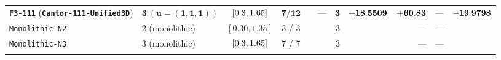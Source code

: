\begin{table}[!htbp]
{\begin{tabular}{llccccrrrrr}
\textbf{\texttt{F3-111}} (\textbf{\texttt{Cantor-111-Unified3D}}) & $\mathbf{3\ (u=(1,1,1))}$ & $[0.3{}, 1.65{}]$ & $\mathbf{7 / 12}$ & \textbf{\roundfour{\NthreeUnithreedFoneoneoneUnifiedAreaUmtwo}} & --- & $\mathbf{3}$ & $\mathbf{+\roundfour{\NthreeUnithreedFoneoneoneUnifiedFzPn}}$ & $\mathbf{+\roundtwo{\NthreeUnithreedFoneoneoneUnifiedFa}}$ & --- & $\mathbf{\roundfour{\NthreeUnithreedFoneoneoneUnifiedThetafoureightFzPn}}$ \\
\texttt{Monolithic-N2} & 2 (monolithic) & $[0.30, 1.35]$ & 3 / 3 & \NatureCantorNtwoHybridrzFullToothPlanformAreaUmtwo{} & \NatureCantorNtwoHybridrzFullToothPlanformPerimeterUm{} & 3 & \CantorNtwoHybridrzBemMonolithicThetathreeFZPn{} & --- & --- & \CantorNtwoHybridrzBemMonolithicThetafoureightFZPn{} \\
\texttt{Monolithic-N3} & 3 (monolithic) & $[0.3{}, 1.65{}]$ & 7 / 7 & \NatureFractalNthreeCantorseventrackFullToothPlanformAreaUmtwo{} & \NatureFractalNthreeCantorseventrackFullToothPlanformPerimeterUm{} & 3 & \FractalNthreeCantorseventrackBemMonolithicThetathreeFZPn{} & --- & --- & \FractalNthreeCantorseventrackBemMonolithicThetafoureightFZPn{} \\
\botrule
\end{tabular}%
}
\end{table}
